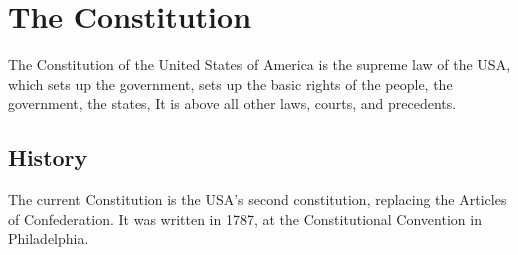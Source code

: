 \documentclass{article}
\begin{document}
\section{The Constitution}
The Constitution of the United States of America is the supreme law of the USA, which sets up the government, sets up the basic rights of the people, the government, the states, \etc It is above all other laws, courts, and precedents.

\subsection{History}
The current Constitution is the USA's second constitution, replacing the Articles of Confederation. 
It was written in 1787, at the Constitutional Convention in Philadelphia.
\end{document}
